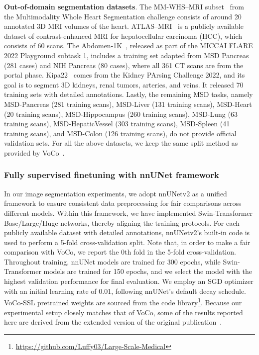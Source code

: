 \textbf{Out-of-domain segmentation datasets}. The MM-WHS–MRI subset~\citep{zhuang2018multivariate} from the Multimodality Whole Heart Segmentation challenge consists of around 20 annotated 3D MRI volumes of the heart.
ATLAS–MRI~\citep{quinton2023tumour} is a publicly available dataset of contrast-enhanced MRI for hepatocellular carcinoma (HCC), which consists of 60 scans.
The Abdomen-1K~\citep{ma2021abdomenct}, released as part of the MICCAI FLARE 2022 Playground subtask 1, includes a training set adapted from MSD Pancreas (281 cases) and NIH Pancreas (80 cases), where all 361 CT scans are from the portal phase.
Kipa22~\citep{he2021meta} comes from the Kidney PArsing Challenge 2022, and its goal is to segment 3D kidneys, renal tumors, arteries, and veins.  It  released 70 training sets with detailed annotations.
Lastly, the remaining MSD tasks, namely MSD-Pancreas (281 training scans), MSD-Liver (131 training scans), MSD-Heart (20 training scans), MSD-Hippocampus (260 training scans), MSD-Lung (63 training scans), MSD-HepaticVessel (303 training scans), MSD-Spleen (41 training scans), and MSD-Colon (126 training scans), do not provide official validation sets.
For all the above datasets, we keep the same split method as provided by VoCo~\citep{wu2024voco}.

\subsubsection{Fully supervised finetuning with nnUNet framework}

In our image segmentation experiments, we adopt nnUNetv2 as a unified framework to ensure consistent data preprocessing for fair comparisons across different models. Within this framework, we have implemented Swin-Transformer Base/Large/Huge networks, thereby aligning the training protocols.
For each publicly available dataset with detailed annotations, nnUNetv2's built-in code is used to perform a 5-fold cross-validation split. Note that, in order to make a fair comparison with VoCo, we report the 0th fold in the 5-fold cross-validation.
Throughout training, nnUNet models are trained for 300 epochs, while Swin-Transformer models are trained for 150 epochs, and we select the model with the highest validation performance for final evaluation.
We employ an SGD optimizer with an initial learning rate of 0.01, following nnUNet's default decay schedule. VoCo-SSL pretrained weights are sourced from the code library\footnote{\url{https://github.com/Luffy03/Large-Scale-Medical}}.
Because our experimental setup closely matches that of VoCo, some of the results reported here are derived from the extended version of the original publication~\citep{wu2024voco}.

